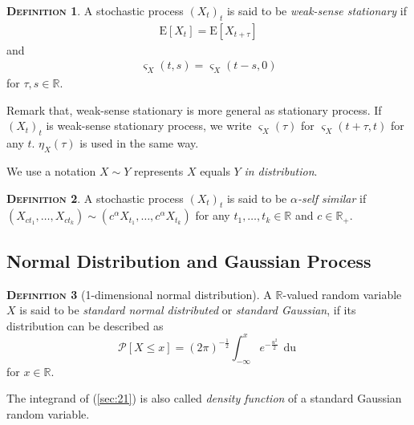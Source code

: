\documentclass[a4paper, twoside, 11pt]{article}
\theoremstyle{definition}
\newtheorem{definition}{\scshape Definition}[section]
\newcommand{\sqbr}[1]{\left[ {#1} \right]}
\begin{document}
\begin{definition}
  A stochastic process $(X_t)_t$ is said to be \emph{weak-sense stationary} if 
  \begin{eqnarray*}
	\mathrm{E}[X_t] = \mathrm{E}[X_{t+\tau}]
  \end{eqnarray*}
  and 
  \begin{eqnarray*}
	\varsigma_{X}(t, s) = \varsigma_{X}(t-s, 0)
  \end{eqnarray*}
  for $\tau, s \in \mathbb{R}$.
\end{definition}
Remark that, weak-sense stationary is more general as stationary process. If $(X_t)_t$ is weak-sense stationary process, we write $\varsigma_X(\tau)$ for $\varsigma_X(t+\tau, t)$ for any $t$. $\eta_X(\tau)$ is used in the same way. 


We use a notation $X \sim Y$ represents $X$ equals $Y$ \emph{in distribution}. 
\begin{definition}
  A stochastic process $(X_t)_{t}$ is said to be \emph{$\alpha$-self similar} if $(X_{ct_1},\dots,X_{ct_k}) \sim (c^\alpha X_{t_1},\dots, c^\alpha X_{t_k})$ for any $t_1,\dots, t_k \in \mathbb{R}$ and $c\in \mathbb{R}_{+}$.
\end{definition}

\subsection{Normal Distribution and Gaussian Process}
\begin{definition}[1-dimensional normal distribution]
  A $\mathbb{R}$-valued random variable $X$ is said to be \emph{standard normal distributed} or \emph{standard Gaussian}, if its distribution can be described as
  \begin{equation}
	\mathcal{P}\sqbr{X \le x} = (2\pi)^{-\frac{1}{2}}\int_{-\infty}^{x} e^{-\frac{u^2}{2}}\,\mathop{du}  
	\label{sec:21}
  \end{equation}
  for $x \in \mathbb{R}$.
\end{definition}
The integrand of (\ref{sec:21}) is also called \emph{density function} of a standard Gaussian random variable.
\end{document}
